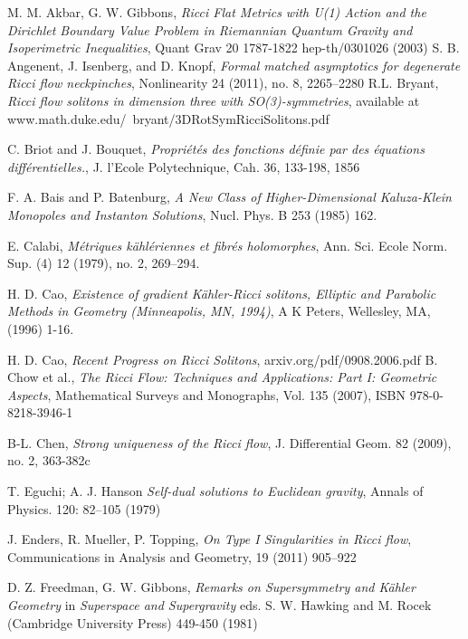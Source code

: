 \documentclass{amsart}
\theoremstyle{definition}
\theoremstyle{remark}
\numberwithin{equation}{section}
\begin{document}
\begin{thebibliography}{9}
M. M. Akbar, G. W. Gibbons, \emph{Ricci Flat Metrics with U(1) Action and the Dirichlet Boundary Value Problem in
Riemannian Quantum Gravity and Isoperimetric Inequalities}, Quant Grav 20 1787-1822 hep-th/0301026 (2003)
 S. B. Angenent, J. Isenberg, and D. Knopf, \emph{Formal matched asymptotics
for degenerate Ricci flow neckpinches}, Nonlinearity 24 (2011), no. 8, 2265–2280
 R.L. Bryant, \emph{Ricci flow solitons in dimension three with SO(3)-symmetries}, available
at www.math.duke.edu/~bryant/3DRotSymRicciSolitons.pdf

 C. Briot and J. Bouquet, \emph{Propriétés des fonctions définie par des équations différentielles.}, J. l'Ecole Polytechnique, Cah. 36, 133-198, 1856

 F. A. Bais and P. Batenburg, \emph{A New Class of Higher-Dimensional Kaluza-Klein Monopoles
and Instanton Solutions}, Nucl. Phys. B 253 (1985) 162.


 E. Calabi, \emph{M\'etriques k\"ahl\'eriennes et fibr\'es holomorphes}, Ann. Sci. Ecole Norm. Sup. (4)
12 (1979), no. 2, 269–294.

 H. D. Cao, \emph{Existence of gradient K\"ahler-Ricci solitons, Elliptic and Parabolic Methods in
Geometry (Minneapolis, MN, 1994)}, A K Peters, Wellesley, MA, (1996) 1-16.

H. D. Cao, \emph{Recent Progress on Ricci Solitons}, arxiv.org/pdf/0908.2006.pdf
B. Chow et al.,
\emph{The Ricci Flow: Techniques and Applications: Part I: Geometric Aspects},
Mathematical Surveys and Monographs, Vol. 135 (2007), ISBN 978-0-8218-3946-1

 B-L. Chen, \emph{Strong uniqueness of the Ricci flow}, J. Differential Geom. 82 (2009), no. 2, 363-382c


 T. Eguchi; A. J. Hanson \emph{Self-dual solutions to Euclidean gravity}, Annals of Physics. 120: 82–105 (1979)

 J. Enders, R. Mueller, P. Topping, \emph{On Type I Singularities in Ricci flow}, Communications in Analysis and Geometry, 19 (2011) 905--922

 D. Z. Freedman, G. W. Gibbons, \emph{Remarks on Supersymmetry and K\"ahler Geometry} in 
\emph{Superspace and Supergravity} eds. S. W. Hawking and M. Rocek (Cambridge University Press) 449-450 (1981)



\end{thebibliography}
\end{document}
